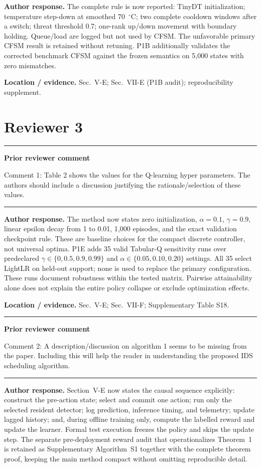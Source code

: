 \documentclass[11pt]{article}
\newenvironment{qbox}
    {\par\vspace{4pt}\noindent\begin{minipage}{\linewidth}\rule{\linewidth}{0.4pt}\par\noindent\textbf{Prior reviewer comment}\par\noindent}
    {\par\rule{\linewidth}{0.4pt}\end{minipage}\par\vspace{4pt}}
\begin{document}
\textbf{Author response.} The complete rule is now reported: TinyDT initialization; temperature step-down at smoothed 70~$^{\circ}$C; two complete cooldown windows after a switch; threat threshold 0.7; one-rank up/down movement with boundary holding. Queue/load are logged but not used by CFSM. The unfavorable primary CFSM result is retained without retuning. P1B additionally validates the corrected benchmark CFSM against the frozen semantics on 5{,}000 states with zero mismatches.

\textbf{Location / evidence.} Sec.~V-E; Sec.~VII-E (P1B audit); reproducibility supplement.

\section*{Reviewer 3}

\begin{qbox}
Comment 1: Table 2 shows the values for the Q-learning hyper parameters. The authors should include a discussion justifying the rationale/selection of these values.
\end{qbox}

\textbf{Author response.} The method now states zero initialization, $\alpha=0.1$, $\gamma=0.9$, linear epsilon decay from 1 to 0.01, 1{,}000 episodes, and the exact validation checkpoint rule. These are baseline choices for the compact discrete controller, not universal optima. P1E adds 35 valid Tabular-Q sensitivity runs over predeclared $\gamma\in\{0, 0.5, 0.9, 0.99\}$ and $\alpha\in\{0.05, 0.10, 0.20\}$ settings. All 35 select LightLR on held-out support; none is used to replace the primary configuration. These runs document robustness within the tested matrix. Pairwise attainability alone does not explain the entire policy collapse or exclude optimization effects.

\textbf{Location / evidence.} Sec.~V-E; Sec.~VII-F; Supplementary Table S18.

\begin{qbox}
Comment 2: A description/discussion on algorithm 1 seems to be missing from the paper. Including this will help the reader in understanding the proposed IDS scheduling algorithm.
\end{qbox}

\textbf{Author response.} Section~V-E now states the causal sequence explicitly: construct the pre-action state; select and commit one action; run only the selected resident detector; log prediction, inference timing, and telemetry; update lagged history; and, during offline training only, compute the labelled reward and update the learner. Formal test execution freezes the policy and skips the update step. The separate pre-deployment reward audit that operationalizes Theorem~1 is retained as Supplementary Algorithm~S1 together with the complete theorem proof, keeping the main method compact without omitting reproducible detail.
\end{document}
